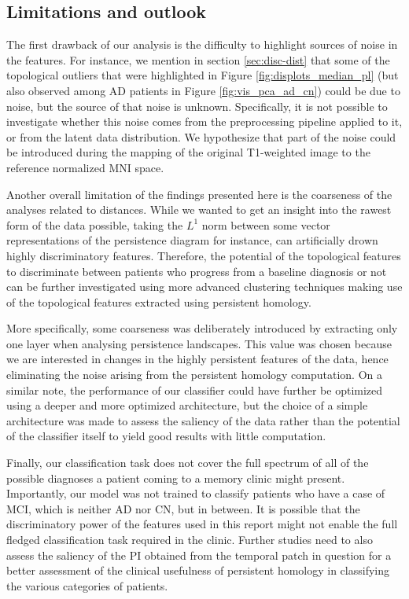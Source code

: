 \documentclass{article}
\begin{document}
\subsection{Limitations and outlook}

The first drawback of our analysis is the difficulty to highlight sources of noise in the features. For instance, we mention in section \ref{sec:disc-dist} that some of the topological outliers that were highlighted in Figure \ref{fig:displots_median_pl} (but also observed among AD patients in Figure \ref{fig:vis_pca_ad_cn}) could be due to noise, but the source of that noise is unknown. Specifically, it is not possible to investigate whether this noise comes from the preprocessing pipeline applied to it, or from the latent data distribution. We hypothesize that part of the noise could be introduced during the mapping of the original T1-weighted image to the reference normalized MNI space.

Another overall limitation of the findings presented here is the coarseness of the analyses related to distances. While we wanted to get an insight into the rawest form of the data possible, taking the $L^1$ norm between some vector representations of the persistence diagram for instance, can artificially drown highly discriminatory features. Therefore, the potential of the topological features to discriminate between patients who progress from a baseline diagnosis or not can be further investigated using more advanced clustering techniques making use of the topological features extracted using persistent homology.

More specifically, some coarseness was deliberately introduced by extracting only one layer when analysing persistence landscapes. This value was chosen because we are interested in changes in the highly persistent features of the data, hence eliminating the noise arising from the persistent homology computation. On a similar note, the performance of our classifier could have further be optimized using a deeper and more optimized architecture, but the choice of a simple architecture was made to assess the saliency of the data rather than the potential of the classifier itself to yield good results with little computation.

Finally, our classification task does not cover the full spectrum of all of the possible diagnoses a patient coming to a memory clinic might present. Importantly, our model was not trained to classify patients who have a case of MCI, which is neither AD nor CN, but in between. It is possible that the discriminatory power of the features used in this report might not enable the full fledged classification task required in the clinic. Further studies need to also assess the saliency of the PI obtained from the temporal patch in question for a better assessment of the clinical usefulness of persistent homology in classifying the various categories of patients.
\end{document}
